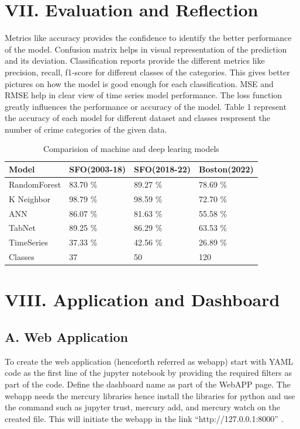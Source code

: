 \documentclass[11 pt,conference,final,]{IEEEtran}
\begin{document}
\section{VII. Evaluation and
Reflection}\label{vii.-evaluation-and-reflection}

Metrics like accuracy provides the confidence to identify the better
performance of the model. Confusion matrix helps in visual
representation of the prediction and its deviation. Classification
reports provide the different metrics like precision, recall, f1-score
for different classes of the categories. This gives better pictures on
how the model is good enough for each classification. MSE and RMSE help
in clear view of time series model performance. The loss function
greatly influences the performance or accuracy of the model. Table 1
represent the accuracy of each model for different dataset and classes
respresent the number of crime categories of the given data.

\begin{table}
\centering
\caption{\label{tab:unnamed-chunk-16}Comparision of machine and deep learing models}
\centering
\begin{tabular}[t]{l|l|l|l}
\hline
Model & SFO(2003-18) & SFO(2018-22) & Boston(2022)\\
\hline
RandomForest & 83.70 \% & 89.27 \% & 78.69 \%\\
\hline
K Neighbor & 98.79 \% & 98.59 \% & 72.70 \%\\
\hline
ANN & 86.07 \% & 81.63 \% & 55.58 \%\\
\hline
TabNet & 89.25 \% & 86.29 \% & 63.53 \%\\
\hline
TimeSeries & 37.33 \% & 42.56 \% & 26.89 \%\\
\hline
Classes & 37 & 50 & 120\\
\hline
\end{tabular}
\end{table}

\section{VIII. Application and
Dashboard}\label{viii.-application-and-dashboard}

\subsection{A. Web Application}\label{a.-web-application}

To create the web application (henceforth referred as webapp) start with
YAML code as the first line of the jupyter notebook by providing the
required filters as part of the code. Define the dashboard name as part
of the WebAPP page. The webapp needs the mercury libraries hence install
the libraries for python and use the command such as jupyter trust,
mercury add, and mercury watch on the created file. This will initiate
the webapp in the link ``http://127.0.0.1:8000'' .
\end{document}
